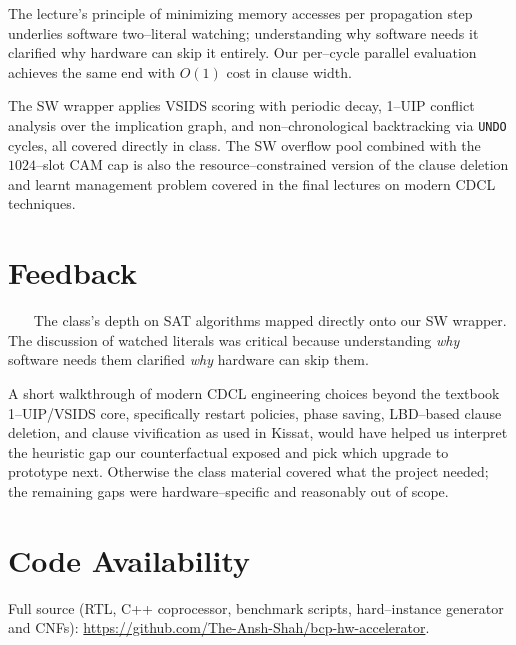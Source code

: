 \documentclass[11pt,letterpaper]{article}
\begin{document}
The lecture's principle of minimizing memory accesses per propagation
step underlies software two--literal watching; understanding why
software needs it clarified why hardware can skip it entirely. Our
per--cycle parallel evaluation achieves the same end with $O(1)$
cost in clause width.

The SW wrapper applies VSIDS scoring with periodic decay, 1--UIP
conflict analysis over the implication graph, and non--chronological
backtracking via \texttt{UNDO} cycles, all covered directly in
class. The SW overflow pool combined with the $1024$--slot CAM cap
is also the resource--constrained version of the clause deletion and
learnt management problem covered in the final lectures on modern
CDCL techniques.

\section{Feedback}
~~~ The class's depth on SAT algorithms mapped directly onto our SW
wrapper. The discussion of watched literals was critical because
understanding \emph{why} software needs them clarified \emph{why}
hardware can skip them.

A short walkthrough of modern CDCL engineering choices beyond the
textbook 1--UIP/VSIDS core, specifically restart policies, phase
saving, LBD--based clause deletion, and clause vivification as used
in Kissat, would have helped us interpret the heuristic gap our
counterfactual exposed and pick which upgrade to prototype next.
Otherwise the class material covered what the project needed; the
remaining gaps were hardware--specific and reasonably out of scope.

\section*{Code Availability}
\noindent
Full source (RTL, C++ coprocessor, benchmark scripts, hard--instance
generator and CNFs):
\url{https://github.com/The-Ansh-Shah/bcp-hw-accelerator}.
\end{document}

